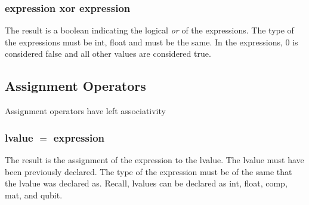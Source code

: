 \subsubsection{expression xor expression}
The result is a boolean indicating the logical \textit{or} of the expressions. The type of the expressions must be int, float and must be the same. In the expressions, 0 is considered false and all other values are considered true.
\subsection{Assignment Operators}
Assignment operators have left associativity
\subsubsection{lvalue $=$ expression}
The result is the assignment of the expression to the lvalue. The lvalue must have been previously declared. The type of the expression must be of the same that the lvalue was declared as. Recall, lvalues can be declared as int, float, comp, mat, and qubit.